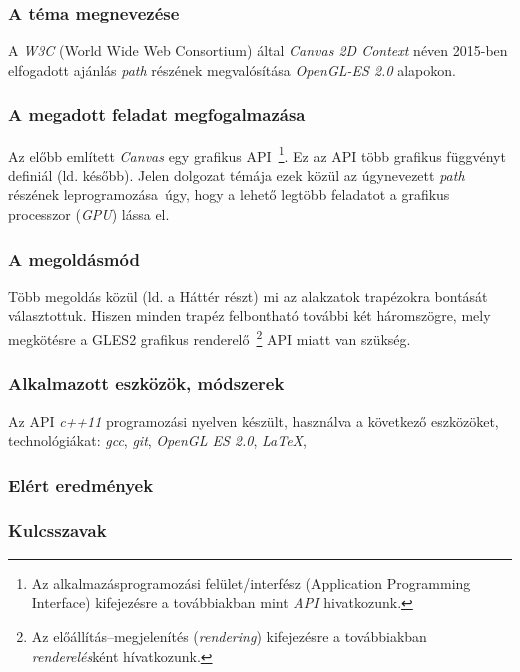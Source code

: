 \documentclass[12pt]{report}
\theoremstyle{definition}
\begin{document}
    \subsubsection*{A téma megnevezése}

  A \emph{W3C} (World Wide Web Consortium) által \emph{Canvas 2D
Context} néven 2015-ben elfogadott ajánlás \emph{path} részének
megvalósítása \emph{OpenGL-ES 2.0} alapokon.

    \subsubsection*{A megadott feladat megfogalmazása}

  Az előbb említett \emph{Canvas} egy grafikus API~\footnote{Az
alkalmazásprogramozási felület/interfész (Application Programming
Interface) kifejezésre a továbbiakban mint \emph{API}
hivatkozunk.}.
  Ez az API több grafikus függvényt definiál (ld. később).
  Jelen dolgozat témája ezek közül az úgynevezett \emph{path} részének
leprogramozása~úgy, hogy a lehető legtöbb feladatot a grafikus
processzor (\textit{GPU}) lássa el.

    \subsubsection*{A megoldásmód}

  Több megoldás közül (ld. a Háttér részt) mi az alakzatok trapézokra
bontását választottuk. Hiszen minden trapéz felbontható további két
háromszögre, mely megkötésre a GLES2 grafikus renderelő~\footnote{Az
előállítás--megjelenítés (\emph{rendering}) kifejezésre a
továbbiakban \emph{renderelés}ként hívatkozunk.} API miatt van
szükség.

    \subsubsection*{Alkalmazott eszközök, módszerek}

  Az API \emph{c++11} programozási nyelven készült, használva a
következő eszközöket, technológiákat: \emph{gcc}, \emph{git},
\textit{OpenGL ES 2.0}, \emph{\LaTeX},

    \subsubsection*{Elért eredmények}

    \subsubsection*{Kulcsszavak}
\end{document}
